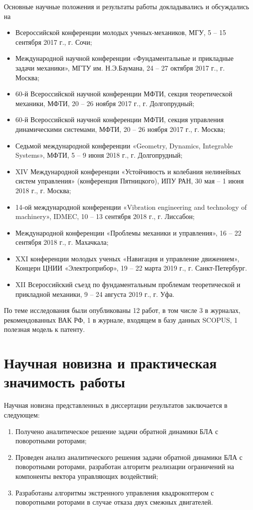 Основные научные положения и результаты работы докладывались и обсуждались на 
\begin{itemize}
\item Всероссийской конференции молодых ученых-механиков, МГУ, 5 -- 15 сентября 2017 г., г. Сочи;
\item Международной научной конференции «Фундаментальные и прикладные задачи механики», МГТУ им. Н.Э.Баумана, 24 -- 27 октября 2017 г., г. Москва;
\item 60-й Всероссийской научной конференции МФТИ, секция теоретической механики, МФТИ, 20 -- 26 ноября 2017 г., г. Долгопрудный;
\item 60-й Всероссийской научной конференции МФТИ, секция управления динамическими системами, МФТИ, 20 -- 26 ноября 2017 г., г. Москва;
\item Седьмой международной конференции «Geometry, Dynamics, Integrable Systems», МФТИ, 5 -- 9 июня 2018 г., г. Долгопрудный;
\item XIV Международной конференции «Устойчивость и колебания нелинейных систем управления» (конференция Пятницкого), ИПУ РАН, 30 мая -- 1 июня 2018 г., г. Москва;
\item 14-ой международной конференции «Vibration engineering and technology of machinery», IDMEC,  10 -- 13 сентября 2018 г., г. Лиссабон;
\item Международной конференции «Проблемы механики и управления», 16 -- 22 сентября 2018 г., г. Махачкала;
\item XXI конференции молодых ученых «Навигация и управление движением», Концерн ЦНИИ «Электроприбор», 19 -- 22 марта 2019 г., г. Санкт-Петербург.
\item XII Всероссийский съезд по фундаментальным проблемам теоретической и прикладной механики, 9 -- 24 августа 2019 г., г. Уфа.

\end{itemize}
По теме исследования были опубликованы 12 работ, в том числе 3 в журналах, рекомендованных ВАК РФ, 1 в журнале, входящем в базу данных SCOPUS, 1 полезная модель к патенту.

\section{Научная новизна и практическая значимость работы}
Научная новизна представленных в диссертации результатов заключается в следующем:
\begin{enumerate}
	\item  Получено аналитическое решение задачи обратной динамики БЛА с поворотными роторами;
	\item  Проведен анализ аналитического решения задачи обратной динамики  БЛА с поворотными роторами, разработан алгоритм реализации ограничений на компоненты вектора управляющих воздействий;
	\item  Разработаны алгоритмы экстренного управления квадрокоптером с поворотными роторами в случае отказа двух смежных двигателей.
\end{enumerate}

